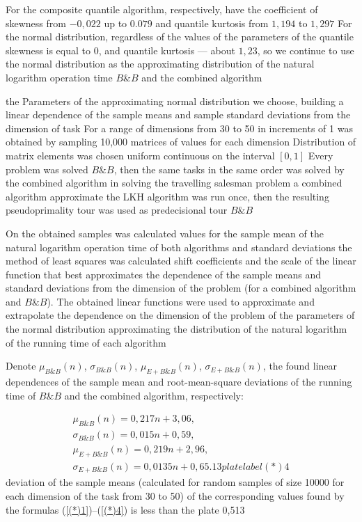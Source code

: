 \documentclass[12pt]{article}
\begin{document}
 For the composite quantile algorithm, respectively, have the coefficient of skewness from $-0,022$ up to $0.079$ and quantile kurtosis from $1,194$ to $1,297$
For the normal distribution, regardless of the values of the parameters of the quantile skewness is equal to 0, and quantile kurtosis --- about $1,23$, so we continue to use the normal distribution as the approximating distribution of the natural logarithm operation time $B\&B$ and the combined algorithm
 
 
 the Parameters of the approximating normal distribution we choose, building a linear dependence of the sample means and sample standard deviations from the dimension of task
For a range of dimensions from 30 to 50 in increments of 1 was obtained by sampling 10,000 matrices of values for each dimension
Distribution of matrix elements was chosen uniform continuous on the interval $[0,1]$
Every problem was solved $B\&B$, then the same tasks in the same order was solved by the combined algorithm
in solving the travelling salesman problem a combined algorithm approximate the LKH algorithm was run once, then the resulting pseudoprimality tour was used as predecisional tour $B\&B$
 
 
 On the obtained samples was calculated values for the sample mean of the natural logarithm operation time of both algorithms and standard deviations
the method of least squares was calculated shift coefficients and the scale of the linear function that best approximates the dependence of the sample means and standard deviations from the dimension of the problem (for a combined algorithm and $B\&B$). The obtained linear functions were used to approximate and extrapolate the dependence on the dimension of the problem of the parameters of the normal distribution approximating the distribution of the natural logarithm of the running time of each algorithm

 
 Denote $\mu_{B\&B}(n)$, $\sigma_{B\&B}(n)$, $\mu_{E+B\&B}(n)$, $\sigma_{E+B\&B}(n)$, the found linear dependences of the sample mean and root-mean-square deviations of the running time of $B\&B$ and the combined algorithm, respectively: 
 
 \begin{align} 
 \mu_{B\&B}(n)=0,217n+3,06,							\label{(*)1}\\ 
 \sigma_{B\&B}(n)=0,015n+0,59,\label{(*)2}\\ 
 \mu_{E+B\&B}(n)=0,219n+2,96,\label{(*)3}\\ 
 \sigma_{E+B\&B}(n)=0,0135 n+0,65.13 platelabel{(*)4} 
 \end{align} 
 deviation of the sample means (calculated for random samples of size 10000 
 for each dimension of the task from 30 to 50) of the corresponding values found by the formulas (\ref{(*)1})--(\ref{(*)4}) is less than the plate 0,513%
\end{document}
